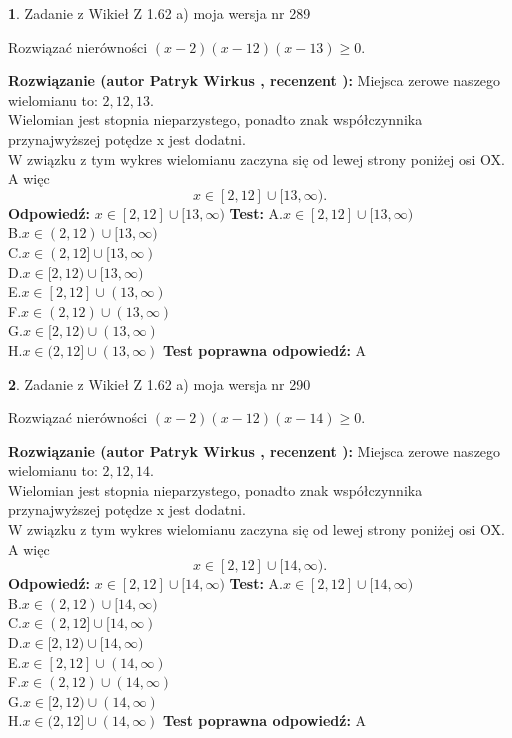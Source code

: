 \documentclass[12pt, a4paper]{article}
\theoremstyle{definition} %
\newtheorem{zad}{}
\newcommand{\zadStart}[1]{\begin{zad}#1\newline}
\newcommand{\zadStop}{\end{zad}}
\newcommand{\rozwStart}[2]{\noindent \textbf{Rozwiązanie (autor #1 , recenzent #2): }\newline}
\newcommand{\rozwStop}{\newline}
\newcommand{\odpStart}{\noindent \textbf{Odpowiedź:}\newline}
\newcommand{\odpStop}{\newline}
\newcommand{\testStart}{\noindent \textbf{Test:}\newline}
\newcommand{\testStop}{\newline}
\newcommand{\kluczStart}{\noindent \textbf{Test poprawna odpowiedź:}\newline}
\newcommand{\kluczStop}{\newline}
\begin{document}
\zadStart{Zadanie z Wikieł Z 1.62 a) moja wersja nr 289}

Rozwiązać nierówności $(x-2)(x-12)(x-13)\ge0$.
\zadStop
\rozwStart{Patryk Wirkus}{}
Miejsca zerowe naszego wielomianu to: $2, 12, 13$.\\
Wielomian jest stopnia nieparzystego, ponadto znak współczynnika przy\linebreak najwyższej potędze x jest dodatni.\\ W związku z tym wykres wielomianu zaczyna się od lewej strony poniżej osi OX. A więc $$x \in [2,12] \cup [13,\infty).$$
\rozwStop
\odpStart
$x \in [2,12] \cup [13,\infty)$
\odpStop
\testStart
A.$x \in [2,12] \cup [13,\infty)$\\
B.$x \in (2,12) \cup [13,\infty)$\\
C.$x \in (2,12] \cup [13,\infty)$\\
D.$x \in [2,12) \cup [13,\infty)$\\
E.$x \in [2,12] \cup (13,\infty)$\\
F.$x \in (2,12) \cup (13,\infty)$\\
G.$x \in [2,12) \cup (13,\infty)$\\
H.$x \in (2,12] \cup (13,\infty)$
\testStop
\kluczStart
A
\kluczStop



\zadStart{Zadanie z Wikieł Z 1.62 a) moja wersja nr 290}

Rozwiązać nierówności $(x-2)(x-12)(x-14)\ge0$.
\zadStop
\rozwStart{Patryk Wirkus}{}
Miejsca zerowe naszego wielomianu to: $2, 12, 14$.\\
Wielomian jest stopnia nieparzystego, ponadto znak współczynnika przy\linebreak najwyższej potędze x jest dodatni.\\ W związku z tym wykres wielomianu zaczyna się od lewej strony poniżej osi OX. A więc $$x \in [2,12] \cup [14,\infty).$$
\rozwStop
\odpStart
$x \in [2,12] \cup [14,\infty)$
\odpStop
\testStart
A.$x \in [2,12] \cup [14,\infty)$\\
B.$x \in (2,12) \cup [14,\infty)$\\
C.$x \in (2,12] \cup [14,\infty)$\\
D.$x \in [2,12) \cup [14,\infty)$\\
E.$x \in [2,12] \cup (14,\infty)$\\
F.$x \in (2,12) \cup (14,\infty)$\\
G.$x \in [2,12) \cup (14,\infty)$\\
H.$x \in (2,12] \cup (14,\infty)$
\testStop
\kluczStart
A
\kluczStop
\end{document}
